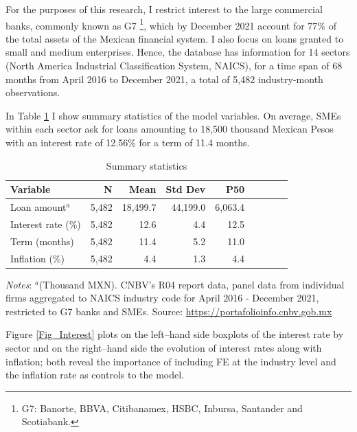 \documentclass[11pt, oneside]{book}
\let\oldfootnote\footnote %
\renewcommand\footnote[1]{%
\oldfootnote{\hspace{0.05mm}#1}}
\begin{document}
For the purposes of this research, I restrict interest to the large commercial banks, commonly known as G7\footnote{G7: Banorte, BBVA, Citibanamex, HSBC, Inbursa, Santander and Scotiabank.}, which by December 2021 account for 77\% of the total assets of the Mexican financial system. I also focus on loans granted to small and medium enterprises.  Hence, the database has information for 14 sectors (North America Industrial Classification System, NAICS), for a time span of 68 months from April 2016 to December 2021, a total of 5,482 industry-month observations.

In Table \ref{Table_1} I show summary statistics of the model variables. On average, SMEs within each sector ask for loans amounting to 18,500 thousand Mexican Pesos with an interest rate of 12.56\% for a term of 11.4 months. 

\begin{table}[htbp]\centering
  \begin{threeparttable}
\caption{Summary statistics}
\label{Table_1}
\begin{tabular}{lrrrrrrrr}
Variable 			& N & Mean & Std Dev & P50 \\
\hline
Loan amount$^a$    & 5,482 & 18,499.7 & 44,199.0 &  6,063.4 \\
Interest rate (\%) & 5,482 & 12.6 	& 4.4 & 12.5 \\
Term (months)      & 5,482 & 11.4 	& 5.2 &  11.0  \\
Inflation (\%)     & 5,482 & 4.4 	& 1.3 & 4.4 \\
\hline
\end{tabular}
\begin{tablenotes}
	\small
      \item \textit{Notes}: $^a$(Thousand MXN). CNBV's R04 report data, panel data from individual firms aggregated to NAICS industry code for April 2016 - December 2021, restricted to G7 banks and SMEs. Source:  \url{https://portafolioinfo.cnbv.gob.mx}
    \end{tablenotes}
  \end{threeparttable}
\end{table}

Figure \ref{Fig_Interest} plots on the left--hand side boxplots of the interest rate by sector and on the right--hand side the evolution of interest rates along with inflation; both reveal the importance of including FE at the industry level and the inflation rate as controls to the model.
\end{document}
